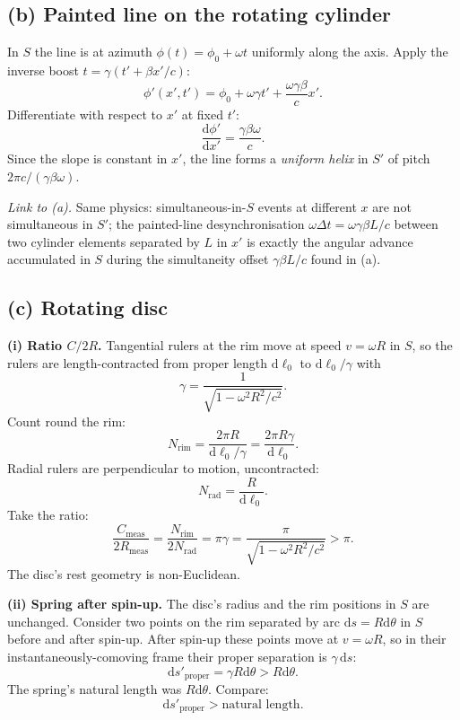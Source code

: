 \documentclass[11pt]{article}
\newcommand{\de}{\mathrm{d}}
\begin{document}
\subsection*{(b) Painted line on the rotating cylinder}

In $S$ the line is at azimuth $\phi(t)=\phi_{0}+\omega t$ uniformly along the axis. Apply the inverse boost $t=\gamma(t'+\beta x'/c)$:
\[ \phi'(x',t')=\phi_{0}+\omega\gamma t'+\frac{\omega\gamma\beta}{c}x'. \]
Differentiate with respect to $x'$ at fixed $t'$:
\begin{equation}
\boxed{\;\frac{\de\phi'}{\de x'}=\frac{\gamma\beta\omega}{c}.\;}
\end{equation}
Since the slope is constant in $x'$, the line forms a \emph{uniform helix} in $S'$ of pitch $2\pi c/(\gamma\beta\omega)$.

\emph{Link to (a).} Same physics: simultaneous-in-$S$ events at different $x$ are not simultaneous in $S'$; the painted-line desynchronisation $\omega\Delta t = \omega\gamma\beta L/c$ between two cylinder elements separated by $L$ in $x'$ is exactly the angular advance accumulated in $S$ during the simultaneity offset $\gamma\beta L/c$ found in (a).

\subsection*{(c) Rotating disc}

\textbf{(i) Ratio $C/2R$.} Tangential rulers at the rim move at speed $v=\omega R$ in $S$, so the rulers are length-contracted from proper length $\de\ell_{0}$ to $\de\ell_{0}/\gamma$ with
\[ \gamma=\frac{1}{\sqrt{1-\omega^{2}R^{2}/c^{2}}}. \]
Count round the rim:
\[ N_{\text{rim}}=\frac{2\pi R}{\de\ell_{0}/\gamma}=\frac{2\pi R\gamma}{\de\ell_{0}}. \]
Radial rulers are perpendicular to motion, uncontracted:
\[ N_{\text{rad}}=\frac{R}{\de\ell_{0}}. \]
Take the ratio:
\begin{equation}
\boxed{\;\frac{C_{\text{meas}}}{2R_{\text{meas}}}=\frac{N_{\text{rim}}}{2N_{\text{rad}}}=\pi\gamma=\frac{\pi}{\sqrt{1-\omega^{2}R^{2}/c^{2}}}>\pi.\;}
\end{equation}
The disc's rest geometry is non-Euclidean.

\textbf{(ii) Spring after spin-up.} The disc's radius and the rim positions in $S$ are unchanged. Consider two points on the rim separated by arc $\de s=R\de\theta$ in $S$ before and after spin-up. After spin-up these points move at $v=\omega R$, so in their instantaneously-comoving frame their proper separation is $\gamma\,\de s$:
\[ \de s'_{\text{proper}}=\gamma R\de\theta>R\de\theta. \]
The spring's natural length was $R\de\theta$. Compare:
\[ \de s'_{\text{proper}}>\text{natural length}. \]
\end{document}
